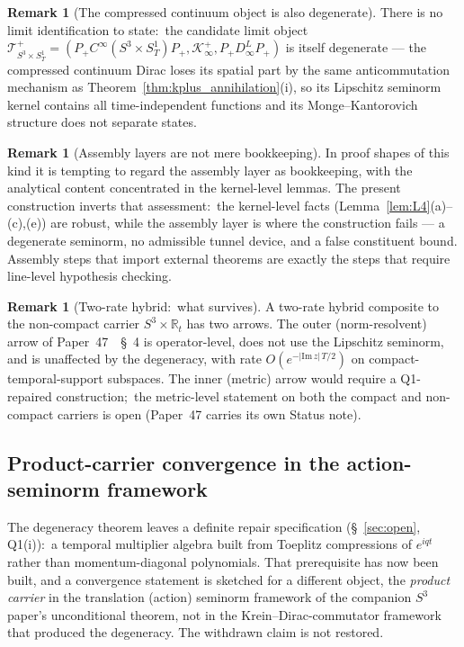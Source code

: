 \documentclass[11pt,a4paper]{article}
\theoremstyle{plain}
\theoremstyle{definition}
\newtheorem{remark}[theorem]{Remark}
\newcommand{\sthree}{S^{3}}
\newcommand{\Manifold}{S^{3}\times S^{1}_{T}}
\newcommand{\Krein}{\mathcal{K}}
\newcommand{\Tcal}{\mathcal{T}}
\newcommand{\R}{\mathbb{R}}
\newcommand{\Kplus}{\Krein^{+}}
\newcommand{\Pplus}{P_{+}}
\begin{document}
\begin{remark}[The compressed continuum object is also degenerate]
\label{rem:limit_identification}
There is no limit identification to state:\ the candidate limit
object $\Tcal^{+}_{\Manifold} = (\Pplus C^{\infty}(\Manifold)\Pplus,
\Kplus_{\infty}, \Pplus D^{L}_{\infty} \Pplus)$ is itself degenerate
— the compressed continuum Dirac loses its spatial part by the same
anticommutation mechanism as
Theorem~\ref{thm:kplus_annihilation}(i), so its Lipschitz seminorm
kernel contains all time-independent functions and its
Monge--Kantorovich structure does not separate states.
\end{remark}

\begin{remark}[Assembly layers are not mere bookkeeping]
\label{rem:bookkeeping}
In proof shapes of this kind it is tempting to regard the assembly
layer as bookkeeping, with the analytical content concentrated in the
kernel-level lemmas. The present construction inverts that
assessment:\ the kernel-level facts
(Lemma~\ref{lem:L4}(a)--(c),(e)) are robust, while the assembly layer
is where the construction fails — a degenerate seminorm, no
admissible tunnel device, and a false constituent bound. Assembly
steps that import external theorems are exactly the steps that
require line-level hypothesis checking.
\end{remark}

\begin{remark}[Two-rate hybrid:\ what survives]
\label{rem:two_rate_hybrid}
A two-rate hybrid composite to the non-compact carrier
$\sthree\times\R_{t}$ has two arrows. The outer (norm-resolvent)
arrow of Paper~47~\cite{paper47}~\S~4 is operator-level, does not use
the Lipschitz seminorm, and is unaffected by the degeneracy, with
rate $O(e^{-|\mathrm{Im}\,z|\,T/2})$ on compact-temporal-support
subspaces. The inner (metric) arrow would require a Q1-repaired
construction;\ the metric-level statement on both the compact and
non-compact carriers is open (Paper~47 carries its own Status note).
\end{remark}

\subsection{Product-carrier convergence in the action-seminorm framework}
\label{sec:product_action_seminorm}

The degeneracy theorem leaves a definite repair specification
(\S~\ref{sec:open}, Q1(i)):\ a temporal multiplier algebra built from
Toeplitz compressions of $e^{iqt}$ rather than momentum-diagonal
polynomials. That prerequisite has now been built, and a convergence
statement is sketched for a different object, the
\emph{product carrier} in the translation (action) seminorm
framework of the companion $\sthree$ paper's unconditional theorem,
not in the Krein--Dirac-commutator framework that produced the
degeneracy. The withdrawn claim is not restored.
\end{document}
